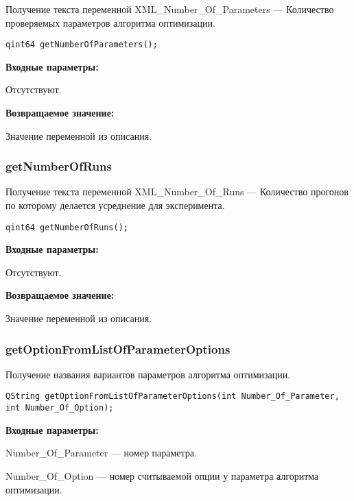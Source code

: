 \documentclass[a4paper,12pt]{article}
\begin{document}
Получение текста переменной  XML\_Number\_Of\_Parameters --- Количество проверяемых параметров алгоритма оптимизации.


\begin{lstlisting}[label=code_syntax_getNumberOfParameters,caption=Синтаксис]
qint64 getNumberOfParameters();
\end{lstlisting}

\textbf{Входные параметры:}

Отсутствуют.

\textbf{Возвращаемое значение:}

Значение переменной из описания.


\subsubsection{getNumberOfRuns}\label{getNumberOfRuns}

Получение текста переменной  XML\_Number\_Of\_Runs --- Количество прогонов по которому делается усреднение для эксперимента.


\begin{lstlisting}[label=code_syntax_getNumberOfRuns,caption=Синтаксис]
qint64 getNumberOfRuns();
\end{lstlisting}

\textbf{Входные параметры:}

Отсутствуют.

\textbf{Возвращаемое значение:}

Значение переменной из описания.


\subsubsection{getOptionFromListOfParameterOptions}\label{getOptionFromListOfParameterOptions}

Получение названия вариантов параметров алгоритма оптимизации.


\begin{lstlisting}[label=code_syntax_getOptionFromListOfParameterOptions,caption=Синтаксис]
QString getOptionFromListOfParameterOptions(int Number_Of_Parameter, int Number_Of_Option);
\end{lstlisting}

\textbf{Входные параметры:}

Number\_Of\_Parameter --- номер параметра.

Number\_Of\_Option --- номер считываемой опции у параметра алгоритма оптимизации.
\end{document}
